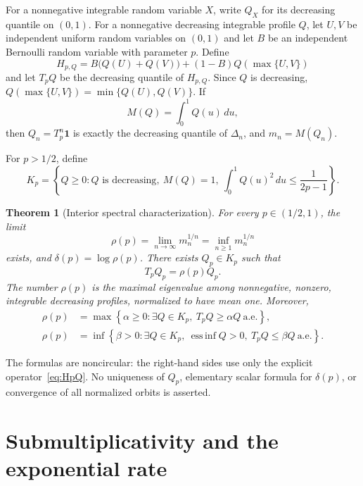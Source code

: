 \documentclass[a4paper,11pt]{amsart}
\newtheorem{theorem}{Theorem}[section]
\theoremstyle{remark}
\DeclareMathOperator*{\essinf}{ess\,inf}
\begin{document}
For a nonnegative integrable random variable $X$, write $Q_X$ for its decreasing quantile on $(0,1)$. For a nonnegative decreasing integrable profile $Q$, let $U,V$ be independent uniform random variables on $(0,1)$ and let $B$ be an independent Bernoulli random variable with parameter $p$. Define
\begin{equation}\label{eq:HpQ}
 H_{p,Q}=B\bigl(Q(U)+Q(V)\bigr)+(1-B)Q(\max\{U,V\})
\end{equation}
and let $T_pQ$ be the decreasing quantile of $H_{p,Q}$. Since $Q$ is decreasing, $Q(\max\{U,V\})=\min\{Q(U),Q(V)\}$. If
\[
 M(Q)=\int_0^1Q(u)\,du,
\]
then $Q_n=T_p^n\mathbf 1$ is exactly the decreasing quantile of $\Delta_n$, and $m_n=M(Q_n)$.

For $p>1/2$, define
\begin{equation}\label{eq:Kp}
 K_p=\left\{Q\ge0: Q\text{ is decreasing},\ M(Q)=1,\
          \int_0^1Q(u)^2\,du\le\frac1{2p-1}\right\}.
\end{equation}

\begin{theorem}[Interior spectral characterization]\label{thm:main}
For every $p\in(1/2,1)$, the limit
\begin{equation}\label{eq:rho}
 \rho(p)=\lim_{n\to\infty}m_n^{1/n}=\inf_{n\ge1}m_n^{1/n}
\end{equation}
exists, and $\delta(p)=\log\rho(p)$. There exists $Q_p\in K_p$ such that
\begin{equation}\label{eq:eigen}
 T_pQ_p=\rho(p)Q_p.
\end{equation}
The number $\rho(p)$ is the maximal eigenvalue among nonnegative, nonzero, integrable decreasing profiles, normalized to have mean one. Moreover,
\begin{align}
 \rho(p)&=\max\left\{\alpha\ge0:\exists Q\in K_p,\ T_pQ\ge\alpha Q\ \text{a.e.}\right\},\label{eq:CWlower}\\
 \rho(p)&=\inf\left\{\beta>0:\exists Q\in K_p,\ \essinf Q>0,\ T_pQ\le\beta Q\ \text{a.e.}\right\}.\label{eq:CWupper}
\end{align}
\end{theorem}

The formulas are noncircular: the right-hand sides use only the explicit operator~\eqref{eq:HpQ}. No uniqueness of $Q_p$, elementary scalar formula for $\delta(p)$, or convergence of all normalized orbits is asserted.

\section{Submultiplicativity and the exponential rate}
\end{document}
